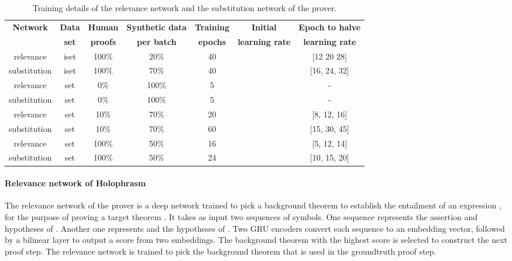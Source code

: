 \documentclass{article}
\begin{document}
\begin{table*}[t]
\caption{Training details of the relevance network and the substitution network of the prover.}
\label{tab:hyper}
\vskip 0.1in
\begin{center}
\begin{small}
\begin{sc}
\begin{tabular}{c c c c c c c}
\toprule
\multicolumn{1}{c}{\bf Network  } 
&\multicolumn{1}{c}{\bf Data  } 
&\multicolumn{1}{c}{\bf Human  } 
&\multicolumn{1}{c}{\bf Synthetic data}
&\multicolumn{1}{c}{\bf Training  } 
&\multicolumn{1}{c}{\bf Initial }
&\multicolumn{1}{c}{\bf Epoch to halve } \\
\multicolumn{1}{c}{\bf   } 
&\multicolumn{1}{c}{\bf set  }
&\multicolumn{1}{c}{\bf proofs } 
&\multicolumn{1}{c}{\bf per batch}
&\multicolumn{1}{c}{\bf  epochs } 
&\multicolumn{1}{c}{\bf learning rate}
&\multicolumn{1}{c}{\bf learning rate }
\\ \midrule
relevance & iset & 100\% & 20\% & 40 &   & [12 20 28] \\
substitution & iset & 100\% & 70\% & 40 &   & [16, 24, 32] \\ \midrule
relevance & set & 0\% & 100\% & 5 &   & - \\
substitution & set & 0\% & 100\% & 5 &   & - \\ \midrule
relevance & set & 10\% & 70\% & 20 &   & [8, 12, 16] \\
substitution & set & 10\% & 70\% & 60 &   & [15, 30, 45] \\ \midrule
relevance & set & 100\% & 50\% & 16 &   & [5, 12, 14] \\
substitution & set & 100\% & 50\% & 24 &   & [10, 15, 20] \\
\bottomrule
\end{tabular}
\end{sc}
\end{small}
\end{center}
\vskip -0.175in
\end{table*}


\paragraph{Relevance network of Holophrasm}
The relevance network of the prover is a deep network trained to pick a background theorem  to establish the entailment of an expression , for the purpose of proving a target theorem .
It takes as input two sequences of symbols.
One sequence represents the assertion and hypotheses of .
Another one represents  and the hypotheses of .
Two GRU encoders convert each sequence to an embedding vector,
followed by a bilinear layer
to output a score from two embeddings.
The background theorem with the highest score is selected to construct the next proof step. 
The relevance network 
is trained to pick the
background theorem that is used in the groundtruth proof step.
\end{document}
